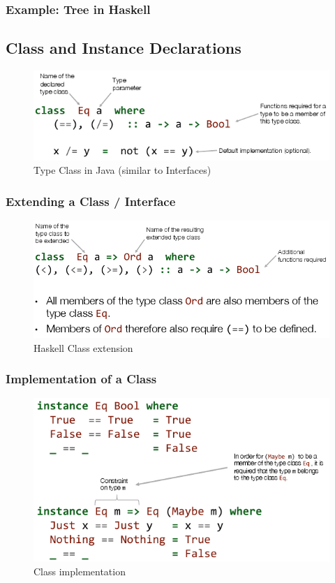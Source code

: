 \subsubsection{Example: Tree in Haskell}


\subsection{Class and Instance Declarations}

\begin{figure}[h!]
\centering
\includegraphics[width=0.7\linewidth]{images/haskell_type_class}
\caption{Type Class in Java (similar to Interfaces)}
\label{fig:haskelltypeclass}
\end{figure}


\subsubsection{Extending a Class / Interface}
\begin{figure}[h!]
\centering
\includegraphics[width=0.7\linewidth]{images/haskell_type_class_extending}
\caption{Haskell Class extension}
\label{fig:haskelltypeclassextending}
\end{figure}

\subsubsection{Implementation of a Class}

\begin{figure}[h!]
\centering
\includegraphics[width=0.7\linewidth]{images/haskell_type_class_definition}
\caption{Class implementation}
\label{fig:haskelltypeclassdefinition}
\end{figure}

